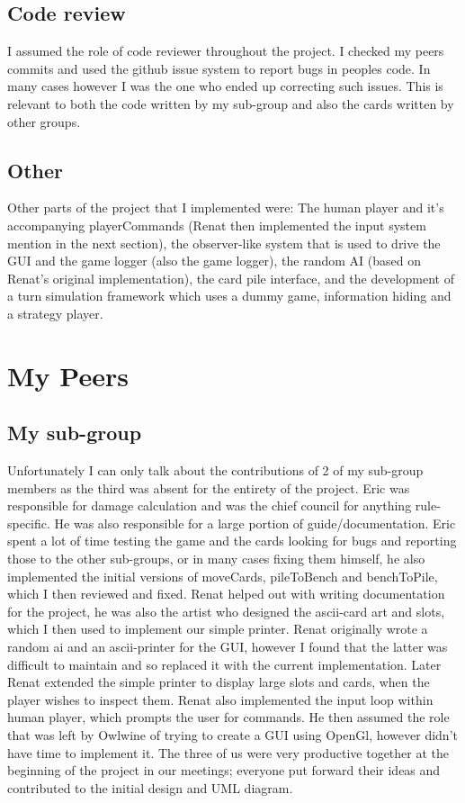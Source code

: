 \documentclass[a4paper]{article}
\begin{document}
\subsection{Code review}
I assumed the role of code reviewer throughout the project. I checked my peers commits and used the github issue system to report bugs in peoples code. In many cases however I was the one who ended up correcting such issues. This is relevant to both the code written by my sub-group and also the cards written by other groups.

\subsection{Other}
Other parts of the project that I implemented were: The human player and it's accompanying playerCommands (Renat then implemented the input system mention in the next section), the observer-like system that is used to drive the GUI and the game logger (also the game logger), the random AI (based on Renat's original implementation), the card pile interface, and the development of a turn simulation framework which uses a dummy game, information hiding and a strategy player.

\section{My Peers}
\subsection{My sub-group}
Unfortunately I can only talk about the contributions of 2 of my sub-group members as the third was absent for the entirety of the project.
Eric was responsible for damage calculation and was the chief council for anything rule-specific. He was also responsible for a large portion of guide/documentation. Eric spent a lot of time testing the game and the cards looking for bugs and reporting those to the other sub-groups, or in many cases fixing them himself, he also implemented the initial versions of moveCards, pileToBench and benchToPile, which I then reviewed and fixed. Renat helped out with writing documentation for the project, he was also the artist who designed the ascii-card art and slots, which I then used to implement our simple printer. Renat originally wrote a random ai and an ascii-printer for the GUI, however I found that the latter was difficult to maintain and so replaced it with the current implementation. Later Renat extended the simple printer to display large slots and cards, when the player wishes to inspect them. Renat also implemented the input loop within human player, which prompts the user for commands. He then assumed the role that was left by Owlwine of trying to create a GUI using OpenGl, however didn't have time to implement it. The three of us were very productive together at the beginning of the project in our meetings; everyone put forward their ideas and contributed to the initial design and UML diagram.
\end{document}
